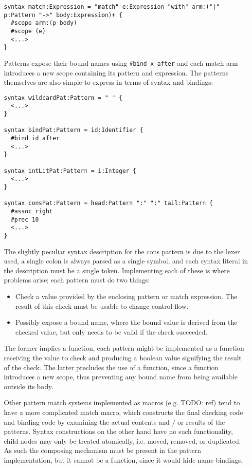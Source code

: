 \documentclass{kththesis}
\begin{document}
\begin{verbatim}
syntax match:Expression = "match" e:Expression "with" arm:("|" p:Pattern "->" body:Expression)+ {
  #scope arm:(p body)
  #scope (e)
  <...>
}
\end{verbatim}

Patterns expose their bound names using \texttt{#bind x after} and each match arm introduces a new scope containing its pattern and expression. The patterns themselves are also simple to express in terms of syntax and bindings:

\begin{verbatim}
syntax wildcardPat:Pattern = "_" {
  <...>
}

syntax bindPat:Pattern = id:Identifier {
  #bind id after
  <...>
}

syntax intLitPat:Pattern = i:Integer {
  <...>
}

syntax consPat:Pattern = head:Pattern ":" ":" tail:Pattern {
  #assoc right
  #prec 10
  <...>
}
\end{verbatim}


The slightly peculiar syntax description for the cons pattern is due to the lexer used, a single colon is always parsed as a single symbol, and each syntax literal in the description must be a single token. Implementing each of these is where problems arise; each pattern must do two things:

\begin{itemize}
  \item Check a value provided by the enclosing pattern or match expression. The result of this check must be usable to change control flow.
  \item Possibly expose a bound name, where the bound value is derived from the checked value, but only needs to be valid if the check succeeded.
\end{itemize}

The former implies a function, each pattern might be implemented as a function receiving the value to check and producing a boolean value signifying the result of the check. The latter precludes the use of a function, since a function introduces a new scope, thus preventing any bound name from being available outside its body.

Other pattern match systems implemented as macros (e.g. TODO: ref) tend to have a more complicated match macro, which constructs the final checking code and binding code by examining the actual contents and / or results of the patterns. Syntax constructions on the other hand have no such functionality, child nodes may only be treated atomically, i.e. moved, removed, or duplicated. As such the composing mechanism must be present in the pattern implementation, but it cannot be a function, since it would hide name bindings.
\end{document}
